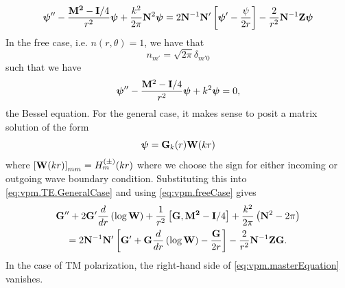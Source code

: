   \begin{equation}
  \label{eq:vpm.TE.GeneralCase}
  \boldsymbol{\psi}''-\frac{\mathbf{M^2}-\mathbf{I}/4}{r^2}\boldsymbol{\psi}+\frac{k^2}{2\pi}\mathbf{N}^2\boldsymbol{\psi}
    =
   2\mathbf{N}^{-1}\mathbf{N}'\left[\boldsymbol{\psi}'-\frac{\psi}{2r}\right]-\frac{2}{r^2}\mathbf{N}^{-1}\mathbf{Z}\boldsymbol{\psi}
  \end{equation}
In the free case, i.e. $n(r,\theta)=1$, we have that
  \begin{equation}
   n_{m'} = \sqrt{2\pi}\delta_{m'0}
  \end{equation}
such that we have
  \begin{equation}
    \label{eq:vpm.freeCase}
    \boldsymbol{\psi}''-\frac{\mathbf{M}^2-\mathbf{I}/4}{r^2}\boldsymbol{\psi}+k^2\boldsymbol{\psi}=0,
  \end{equation}
the Bessel equation. For the general case, it makes sense
to posit a matrix solution of the form
  \begin{equation}
   \boldsymbol{\psi}=\mathbf{G}_k(r)\mathbf{W}(kr)
  \end{equation}
where $\left[\mathbf{W}(kr)\right]_{mm}=H_m^{(\pm)}(kr)$ where
we choose the sign for either incoming or outgoing 
wave boundary condition. Substituting this into \eqref{eq:vpm.TE.GeneralCase}
and using \eqref{eq:vpm.freeCase} gives
  \begin{multline}
    \label{eq:vpm.masterEquation}
    \mathbf{G}''+2\mathbf{G}'\frac{d}{dr}\left(\log\mathbf{W}\right)+\frac{1}{r^2}\left[\mathbf{G},\mathbf{M^2}-\mathbf{I}/4\right]+\frac{k^2}{2\pi}\left(\mathbf{N}^2-2\pi\right)
     \\ =
    2\mathbf{N}^{-1}\mathbf{N}'\left[\mathbf{G}'+\mathbf{G}\frac{d}{dr}\left(\log\mathbf{W}\right)-\frac{\mathbf{G}}{2r}\right]-\frac{2}{r^2}\mathbf{N}^{-1}\mathbf{ZG}.
  \end{multline}
In the case of TM polarization, the right-hand side 
of \eqref{eq:vpm.masterEquation} vanishes. 

